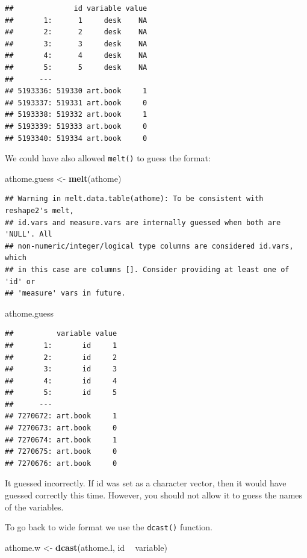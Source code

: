 \documentclass[]{book}
\newenvironment{Shaded}{\begin{snugshade}}{\end{snugshade}}
\newcommand{\KeywordTok}[1]{\textcolor[rgb]{0.13,0.29,0.53}{\textbf{#1}}}
\newcommand{\NormalTok}[1]{#1}
\newcommand{\OperatorTok}[1]{\textcolor[rgb]{0.81,0.36,0.00}{\textbf{#1}}}
\newcommand{\StringTok}[1]{\textcolor[rgb]{0.31,0.60,0.02}{#1}}
\begin{document}
\begin{verbatim}
##              id variable value
##       1:      1     desk    NA
##       2:      2     desk    NA
##       3:      3     desk    NA
##       4:      4     desk    NA
##       5:      5     desk    NA
##      ---                      
## 5193336: 519330 art.book     1
## 5193337: 519331 art.book     0
## 5193338: 519332 art.book     1
## 5193339: 519333 art.book     0
## 5193340: 519334 art.book     0
\end{verbatim}

We could have also allowed \texttt{melt()} to guess the format:

\begin{Shaded}
\begin{Highlighting}[]
\NormalTok{athome.guess <-}\StringTok{ }\KeywordTok{melt}\NormalTok{(athome)}
\end{Highlighting}
\end{Shaded}

\begin{verbatim}
## Warning in melt.data.table(athome): To be consistent with reshape2's melt,
## id.vars and measure.vars are internally guessed when both are 'NULL'. All
## non-numeric/integer/logical type columns are considered id.vars, which
## in this case are columns []. Consider providing at least one of 'id' or
## 'measure' vars in future.
\end{verbatim}

\begin{Shaded}
\begin{Highlighting}[]
\NormalTok{athome.guess}
\end{Highlighting}
\end{Shaded}

\begin{verbatim}
##          variable value
##       1:       id     1
##       2:       id     2
##       3:       id     3
##       4:       id     4
##       5:       id     5
##      ---               
## 7270672: art.book     1
## 7270673: art.book     0
## 7270674: art.book     1
## 7270675: art.book     0
## 7270676: art.book     0
\end{verbatim}

It guessed incorrectly. If id was set as a character vector, then it would have guessed correctly this time. However, you should not allow it to guess the names of the variables.

To go back to wide format we use the \texttt{dcast()} function.

\begin{Shaded}
\begin{Highlighting}[]
\NormalTok{athome.w <-}\StringTok{ }\KeywordTok{dcast}\NormalTok{(athome.l,}
\NormalTok{                  id }\OperatorTok{~}\StringTok{ }\NormalTok{variable)}
\end{Highlighting}
\end{Shaded}
\end{document}

